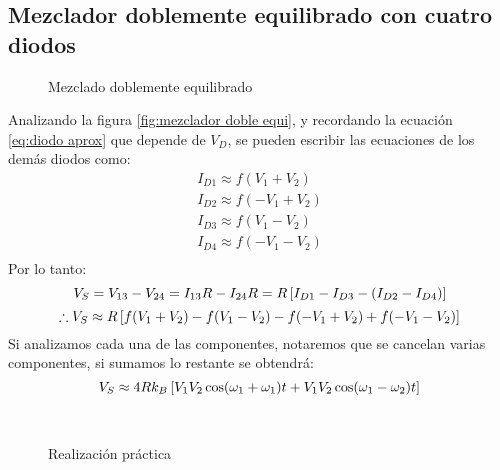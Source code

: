 \documentclass[
	12pt, %
	fleqn, %
	a4paper, %
	oneside, %
]{LegrandOrangeBook}
\begin{document}
\subsection{Mezclador doblemente equilibrado con cuatro diodos}
\begin{figure}[H]
\centering
{}
\caption{Mezclado doblemente equilibrado}
\end{figure}
Analizando la figura \ref{fig:mezclador doble equi}, y recordando la ecuación \ref{eq:diodo aprox} que depende de $V_D$, se pueden escribir las ecuaciones de los demás diodos como:
\begin{align}
I_{D1}\approx f(V_1+V_2)\\
I_{D2}\approx f(-V_1+V_2)\\
I_{D3}\approx f(V_1-V_2)\\
I_{D4}\approx f(-V_1-V_2)\\
\end{align}
Por lo tanto:
\begin{equation}
V_S=V_{13}-V_{24}=I_{13}R-I_{24}R=R\left[I_{D1}-I_{D3}-(I_{D2}-I_{D4})\right]
\end{equation}
\begin{equation}
\therefore V_S\approx R\left[f(V_1+V_2)-f(V_1-V_2)-f(-V_1+V_2)+f(-V_1-V_2)\right]
\end{equation}
Si analizamos cada una de las componentes, notaremos que se cancelan varias componentes, si sumamos lo restante se obtendrá:
\begin{equation}
V_S\approx 4Rk_B\left[V_1V_2\cos(\omega_1+\omega_1)t+V_1V_2\cos(\omega_1-\omega_2)t\right]
\end{equation}
\begin{figure}[]
\centering
{}
\\
\caption{Realización práctica}
\end{figure}
\end{document}
